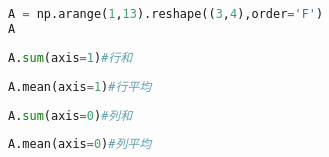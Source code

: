 \documentclass[UTF8,a4paper,12pt]{ctexart}  %
\begin{document}
\begin{lstlisting}[language=Python]
A = np.arange(1,13).reshape((3,4),order='F')
A
\end{lstlisting}

\begin{lstlisting}[language=Python]
A.sum(axis=1)#行和
\end{lstlisting}

\begin{lstlisting}[language=Python]
A.mean(axis=1)#行平均
\end{lstlisting}

\begin{lstlisting}[language=Python]
A.sum(axis=0)#列和
\end{lstlisting}

\begin{lstlisting}[language=Python]
A.mean(axis=0)#列平均
\end{lstlisting}
\end{document}

